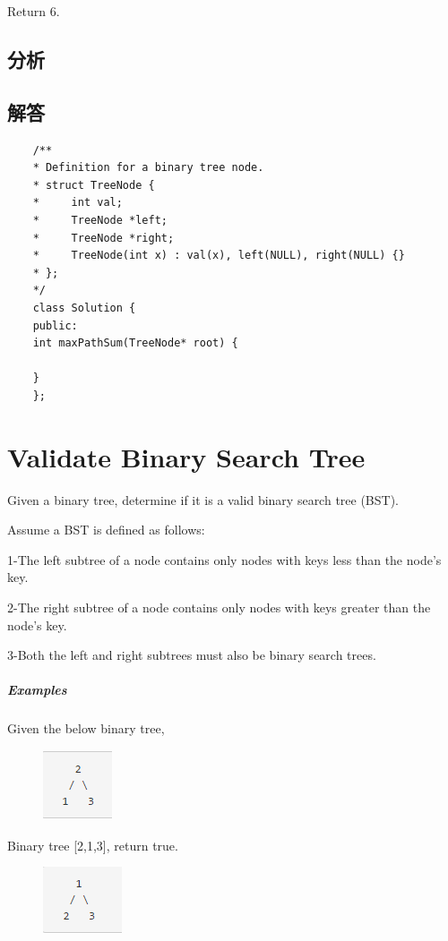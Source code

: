 \documentclass[UTF8,a4paper,12pt]{ctexbook}
\begin{document}
		Return 6.	
	\subsection{分析}
	
	\subsection{解答}
		\begin{lstlisting}
	/**
	* Definition for a binary tree node.
	* struct TreeNode {
	*     int val;
	*     TreeNode *left;
	*     TreeNode *right;
	*     TreeNode(int x) : val(x), left(NULL), right(NULL) {}
	* };
	*/
	class Solution {
	public:
	int maxPathSum(TreeNode* root) {
	
	}
	};
		\end{lstlisting}
\section{Validate Binary Search Tree}
		Given a binary tree, determine if it is a valid binary search tree (BST).
		
		Assume a BST is defined as follows:
		
		1-The left subtree of a node contains only nodes with keys less than the node's key.
		
		2-The right subtree of a node contains only nodes with keys greater than the node's key.
		
		3-Both the left and right subtrees must also be binary search trees.
	\subparagraph{Examples}
		Given the below binary tree,
		
		\begin{figure}[h]
			\centering
			\includegraphics[scale = 1]{Tree_2.png}
		\end{figure}
		
		Binary tree [2,1,3], return true.
		
		\begin{figure}[h]
			\centering
			\includegraphics[scale = 1]{Tree_3.png}
		\end{figure}
		
\end{document}
